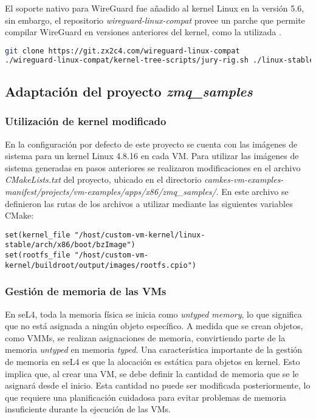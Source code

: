 El soporte nativo para WireGuard fue añadido al kernel Linux en la versión 5.6, sin embargo, el repositorio \textit{wireguard-linux-compat} provee un parche que permite compilar WireGuard en versiones anteriores del kernel, como la utilizada \cite{wireguard-compilation}.

\begin{lstlisting}[language=bash, caption={Parche wireguard-linux-compat para el kernel Linux 4.9.337}, label={lst:wireguard_patch}]
git clone https://git.zx2c4.com/wireguard-linux-compat
./wireguard-linux-compat/kernel-tree-scripts/jury-rig.sh ./linux-stable
\end{lstlisting}


\subsection{Adaptación del proyecto \textit{zmq\_samples}}
\subsubsection{Utilización de kernel modificado}
En la configuración por defecto de este proyecto se cuenta con las imágenes de sistema para un kernel Linux 4.8.16 en cada VM. Para utilizar las imágenes de sistema generadas en pasos anteriores se realizaron modificaciones en el archivo \textit{CMakeLists.txt} del proyecto, ubicado en el directorio \textit{camkes-vm-examples-manifest/projects/vm-examples/apps/x86/zmq\_samples/}. En este archivo se definieron las rutas de los archivos a utilizar mediante las siguientes variables CMake:

\begin{lstlisting}[caption={Variables CMakeLists.txt del proyecto zmq\_samples}, label={lst:zmq_samples_cmake}]
set(kernel_file "/host/custom-vm-kernel/linux-stable/arch/x86/boot/bzImage")
set(rootfs_file "/host/custom-vm-kernel/buildroot/output/images/rootfs.cpio")
\end{lstlisting}

\subsubsection{Gestión de memoria de las VMs}
En seL4, toda la memoria física se inicia como \textit{untyped memory}, lo que significa que no está asignada a ningún objeto específico. A medida que se crean objetos, como VMMs, se realizan asignaciones de memoria, convirtiendo parte de la memoria \textit{untyped} en memoria \textit{typed}. Una característica importante de la gestión de memoria en seL4 es que la alocación es estática para objetos en kernel. Esto implica que, al crear una VM, se debe definir la cantidad de memoria que se le asignará desde el inicio. Esta cantidad no puede ser modificada posteriormente, lo que requiere una planificación cuidadosa para evitar problemas de memoria insuficiente durante la ejecución de las VMs. 


